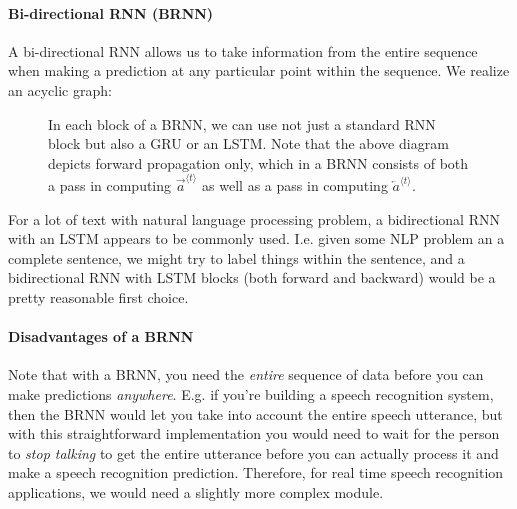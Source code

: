\documentclass[12pt]{article}
\begin{document}
\paragraph{Bi-directional RNN (BRNN)} A bi-directional RNN allows us to take information from the entire sequence when making a prediction at any particular point within the sequence. We realize an acyclic graph:
\begin{figure}[h]
  \centering
  \caption{\footnotesize In each block of a BRNN, we can use not just a standard RNN block but also a GRU or an LSTM. Note that the above diagram depicts forward propagation only, which in a BRNN consists of both a \color{orange!50}{left-to-right} \color{black} pass in computing $\overrightarrow a^{\langle t \rangle}$ as well as a \color{purple!50}{right-to-left} \color{black} pass in computing $\overleftarrow a^{\langle t \rangle}$.}
\end{figure}

For a lot of text with natural language processing problem, a bidirectional RNN with an LSTM appears to be commonly used. I.e. given some NLP problem an a complete sentence, we might try to label things within the sentence, and a bidirectional RNN with LSTM blocks (both forward and backward) would be a pretty reasonable first choice.

\paragraph{Disadvantages of a BRNN} Note that with a BRNN, you need the \emph{entire} sequence of data before you can make predictions \emph{anywhere}. E.g. if you're building a speech recognition system, then the BRNN would let you take into account the entire speech utterance, but with this straightforward implementation you would need to wait for the person to \emph{stop talking} to get the entire utterance before you can actually process it and make a speech recognition prediction. Therefore, for real time speech recognition applications, we would need a slightly more complex module.
\end{document}
